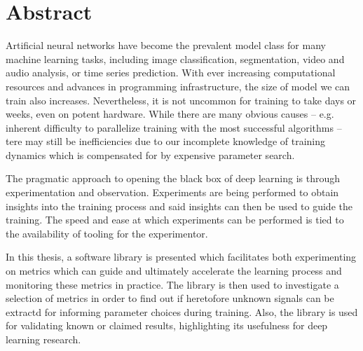 \chapter*{Abstract}

Artificial neural networks have become the prevalent model class for many
machine learning tasks, including image classification, segmentation, video and
audio analysis, or time series prediction. With ever increasing computational
resources and advances in programming infrastructure, the size of model we can
train also increases. Nevertheless, it is not uncommon for training to take days
or weeks, even on potent hardware. While there are many obvious causes -- e.g.
inherent difficulty to parallelize training with the most successful algorithms
-- tere may still be inefficiencies due to our incomplete knowledge of training
dynamics which is compensated for by expensive parameter search.

The pragmatic approach to opening the black box of deep learning is
through experimentation and observation. Experiments are being performed to
obtain insights into the training process and said insights can then be used to
guide the training.  The speed and ease at which experiments can be performed is
tied to the availability of tooling for the experimentor.

In this thesis, a software library is presented which facilitates both
experimenting on metrics which can guide and ultimately accelerate the learning
process and monitoring these metrics in practice. The library is then used to
investigate a selection of metrics in order to find out if heretofore unknown
signals can be extractd for informing parameter choices during training. Also,
the library is used for validating known or claimed results, highlighting its
usefulness for deep learning research.

